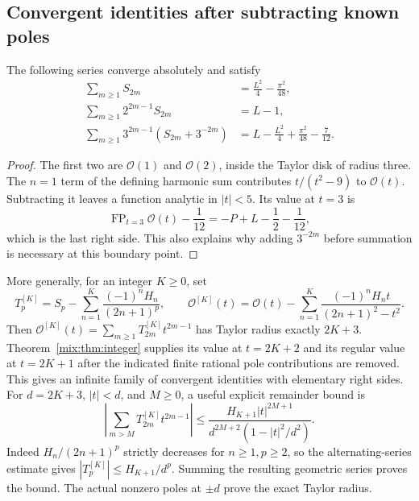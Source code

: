 \subsection{Convergent identities after subtracting known poles}

\begin{corollary}
\label{mix:cor:resummation}
The following series converge absolutely and satisfy
\begin{align}
 \sum_{m\ge1}S_{2m}
 &=\frac{L^2}4-\frac{\pi^2}{48},\label{mix:eq:sum1}\\
 \sum_{m\ge1}2^{2m-1}S_{2m}
 &=L-1,\label{mix:eq:sum2}\\
 \sum_{m\ge1}3^{2m-1}(S_{2m}+3^{-2m})
 &=L-\frac{L^2}4+\frac{\pi^2}{48}-\frac7{12}.
 \label{mix:eq:sum3}
\end{align}
\end{corollary}
\begin{proof}
The first two are $\mathcal O(1)$ and $\mathcal O(2)$, inside the
Taylor disk of radius three. The $n=1$ term of the defining harmonic
sum contributes $t/(t^2-9)$ to $\mathcal O(t)$. Subtracting it leaves
a function analytic in $|t|<5$. Its value at $t=3$ is
\[
 \operatorname{FP}_{t=3}\mathcal O(t)-\frac1{12}
 =-P+L-\frac12-\frac1{12},
\]
which is the last right side. This also explains why adding $3^{-2m}$
before summation is necessary at this boundary point.
\end{proof}

More generally, for an integer $K\ge0$, set
\[
 T_p^{[K]}=S_p-\sum_{n=1}^K\frac{(-1)^nH_n}{(2n+1)^p},\qquad
 \mathcal O^{[K]}(t)=\mathcal O(t)
   -\sum_{n=1}^K\frac{(-1)^nH_nt}{(2n+1)^2-t^2}.
\]
Then $\mathcal O^{[K]}(t)=\sum_{m\ge1}T_{2m}^{[K]}t^{2m-1}$ has
Taylor radius exactly $2K+3$. Theorem~\ref{mix:thm:integer} supplies
its value at $t=2K+2$ and its regular value at $t=2K+1$ after the
indicated finite rational pole contributions are removed. This gives an
infinite family of convergent identities with elementary right sides.
For $d=2K+3$, $|t|<d$, and $M\ge0$, a useful explicit remainder bound is
\begin{equation}\label{mix:eq:tail}
 \left|\sum_{m>M}T_{2m}^{[K]}t^{2m-1}\right|
 \le \frac{H_{K+1}|t|^{2M+1}}
 {d^{2M+2}(1-|t|^2/d^2)}.
\end{equation}
Indeed $H_n/(2n+1)^p$ strictly decreases for $n\ge1,p\ge2$, so the
alternating-series estimate gives $|T_p^{[K]}|\le H_{K+1}/d^p$.
Summing the resulting geometric series proves the bound. The actual
nonzero poles at $\pm d$ prove the exact Taylor radius.

